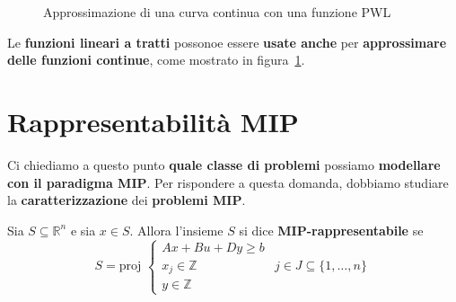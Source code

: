 \begin{figure}[!ht]
    \centering
    \caption{Approssimazione di una curva continua con una funzione PWL}
    \label{fig:04_08_ApprossimazioneConPWL}
\end{figure}

\begin{remark}
    Le \textbf{funzioni lineari a tratti} possonoe essere \textbf{usate anche}
    per \textbf{approssimare delle funzioni continue}, come mostrato
    in figura~\ref{fig:04_08_ApprossimazioneConPWL}.
\end{remark}

\section{Rappresentabilità MIP}

Ci chiediamo a questo punto \textbf{quale classe di problemi} possiamo
\textbf{modellare con il paradigma MIP}. Per rispondere a questa domanda,
dobbiamo studiare la \textbf{caratterizzazione} dei \textbf{problemi MIP}.

\begin{definition}
    Sia $S \subseteq \mathbb{R}^n$ e sia $x\in S$.
    Allora l'insieme $S$ si dice \textbf{MIP-rappresentabile} se
    \[
        S = \text{proj } \begin{cases}
            Ax + Bu + Dy \ge b \\ 
            x_j \in \mathbb{Z} & j\in J \subseteq \{1,\ldots ,n\} \\ 
            y\in \mathbb{Z}
        \end{cases}
    \] 
\end{definition}

